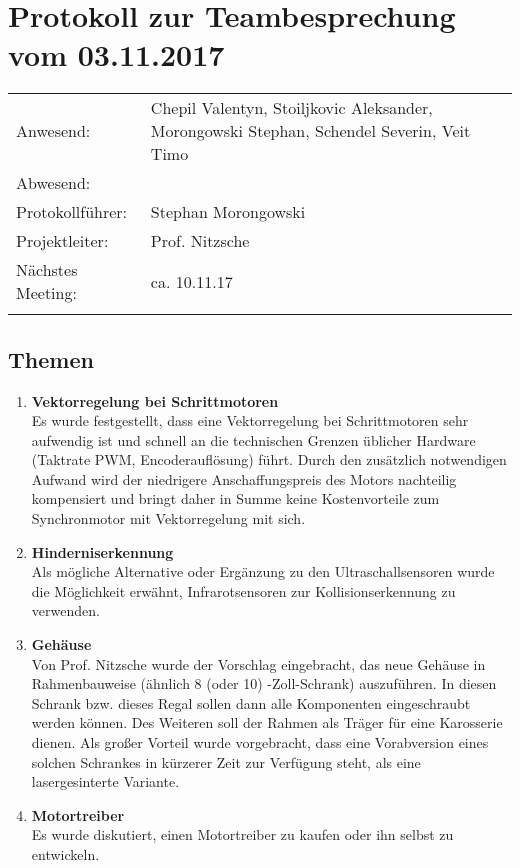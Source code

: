 \documentclass[10pt]{scrartcl}
\begin{document}
\section*{Protokoll zur Teambesprechung vom 03.11.2017}


\begin{tabularx}{\textwidth} {@{\hspace{0.0cm}} lX @{}}
Anwesend: & Chepil Valentyn, Stoiljkovic Aleksander, Morongowski Stephan, Schendel Severin, Veit Timo\\%
Abwesend: & \\
Protokollführer: & Stephan Morongowski \\
Projektleiter: & Prof. Nitzsche\\
Nächstes Meeting: & ca. 10.11.17 \\%
&\\
\end{tabularx}

\subsection*{Themen}
	\begin{enumerate}
		\item \textbf{Vektorregelung bei Schrittmotoren} \\
        Es wurde festgestellt, dass eine Vektorregelung bei Schrittmotoren sehr aufwendig ist und schnell an die technischen Grenzen üblicher Hardware (Taktrate PWM, Encoderauflösung) führt. Durch den zusätzlich notwendigen Aufwand wird der niedrigere Anschaffungspreis des Motors nachteilig kompensiert und bringt daher in Summe keine Kostenvorteile zum Synchronmotor mit Vektorregelung mit sich.
		\item \textbf{Hinderniserkennung} \\
        Als mögliche Alternative oder Ergänzung zu den Ultraschallsensoren wurde die Möglichkeit erwähnt, Infrarotsensoren zur Kollisionserkennung zu verwenden.
        \item \textbf{Gehäuse} \\
		Von Prof. Nitzsche wurde der Vorschlag eingebracht, das neue Gehäuse in Rahmenbauweise (ähnlich 8 (oder 10) -Zoll-Schrank) auszuführen. In diesen Schrank bzw. dieses Regal sollen dann alle Komponenten eingeschraubt werden können. Des Weiteren soll der Rahmen als Träger für eine Karosserie dienen. Als großer Vorteil wurde vorgebracht, dass eine Vorabversion eines solchen Schrankes in kürzerer Zeit zur Verfügung steht, als eine lasergesinterte Variante.
        \item \textbf{Motortreiber} \\
        Es wurde diskutiert, einen Motortreiber zu kaufen oder ihn selbst zu entwickeln.
	\end{enumerate}
\end{document}
